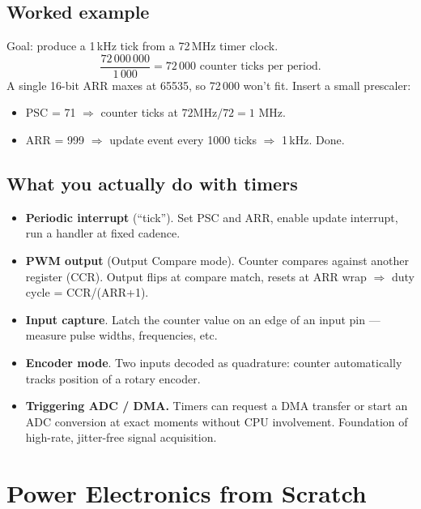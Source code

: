 \documentclass[11pt,a4paper]{article}
\begin{document}
\subsection{Worked example}

Goal: produce a 1\,kHz tick from a 72\,MHz timer clock.
\[
\frac{72\,000\,000}{1\,000} = 72\,000 \text{ counter ticks per period}.
\]
A single 16-bit ARR maxes at 65535, so 72\,000 won't fit. Insert a small
prescaler:
\begin{itemize}[leftmargin=*]
    \item PSC = 71 $\Rightarrow$ counter ticks at $72\text{MHz}/72 = 1$ MHz.
    \item ARR = 999 $\Rightarrow$ update event every 1000 ticks
    $\Rightarrow$ 1\,kHz. Done.
\end{itemize}

\subsection{What you actually do with timers}

\begin{itemize}[leftmargin=*]
    \item \textbf{Periodic interrupt} (``tick''). Set PSC and ARR, enable
    update interrupt, run a handler at fixed cadence.
    \item \textbf{PWM output} (Output Compare mode). Counter compares
    against another register (CCR). Output flips at compare match,
    resets at ARR wrap $\Rightarrow$ duty cycle = CCR/(ARR+1).
    \item \textbf{Input capture}. Latch the counter value on an edge of
    an input pin --- measure pulse widths, frequencies, etc.
    \item \textbf{Encoder mode}. Two inputs decoded as quadrature: counter
    automatically tracks position of a rotary encoder.
    \item \textbf{Triggering ADC / DMA.} Timers can request a DMA transfer
    or start an ADC conversion at exact moments without CPU involvement.
    Foundation of high-rate, jitter-free signal acquisition.
\end{itemize}

\section{Power Electronics from Scratch}
\end{document}
